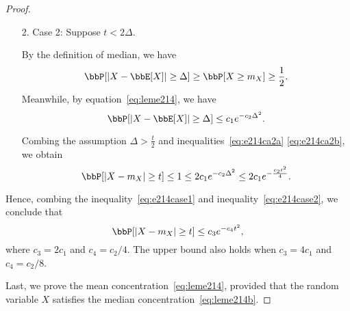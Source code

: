 \documentclass[11pt]{article}
\newcommand{\off}[1]{\left[#1\right]}
\theoremstyle{plain}
\theoremstyle{definition}
\begin{document}
\begin{proof}
\begin{enumerate}
		\item[2.] Case 2:   Suppose $t < 2\Delta$. 
		
		\vspace{0.2cm}
		By the definition of median, we have
		\begin{equation}\label{eq:e214ca2a}
			\bbP[|X - \bbE[X]| \geq \Delta] \geq \bbP[X \geq m_X] \geq \frac{1}{2}.
		\end{equation}
		Meanwhile, by equation~\eqref{eq:leme214}, we have
		\begin{equation}\label{eq:e214ca2b}
			\bbP[|X - \bbE[X]| \geq \Delta] \leq c_1 e^{-c_2 \Delta^2}.
		\end{equation}
		
		Combing the assumption $\Delta > \frac{t}{2}$  and inequalities~\eqref{eq:e214ca2a} \eqref{eq:e214ca2b}, we obtain
		\begin{equation}\label{eq:e214case2}
			\bbP[|X - m_X| \geq t]\leq 1\leq 2c_1  e^{-c_2 \Delta^2} \leq 2c_1  e^{-\frac{c_2 t^2}{4}}. 
		\end{equation}
		
	\end{enumerate}
	
	Hence, combing the inequality~\eqref{eq:e214case1} and inequality~\eqref{eq:e214case2}, we conclude that
	\begin{equation}
		\bbP[|X - m_X| \geq t] \leq c_3 e^{-c_4 t^2}, 
	\end{equation}
	where $c_3 = 2c_1$ and $c_4 = c_2/4$. The upper bound also holds when $c_3 = 4 c_1$ and $c_4 = c_2/8$.
	
	\vspace{0.2cm}
	
	Last, we prove the mean concentration~\eqref{eq:leme214}, provided that the random variable $X$ satisfies the median concentration~\eqref{eq:leme214b}. 
	
	\iffalse
	\vspace{0.2cm}
	
	As the proof for median concentration~\eqref{eq:leme214b}, we also consider the following two cases.
	\begin{enumerate}
		\item[1.] Case 1: Suppose $t \geq 2\Delta$.
		
		\vspace{0.2cm}
		Note the triangle inequality $|X - m_X| + \Delta \geq |X - \bbE[X]|$ and the assumption $\frac{t}{2} \geq \Delta$. We have
		\begin{equation}
			\bbP[|X - \bbE[X]| \geq t ] \leq \bbP \off{|X - m_X| \geq \frac{t}{2}} \leq c_3 e^{-\frac{c_4 t^2}{4}},
		\end{equation}
		where the last inequality follows from the median concentration~\eqref{eq:leme214b}.
		
		\item[2.] Case 2: Suppose $t < 2\Delta$.
	\end{enumerate}
	
	\fi
	\end{proof}
	
\end{document}
